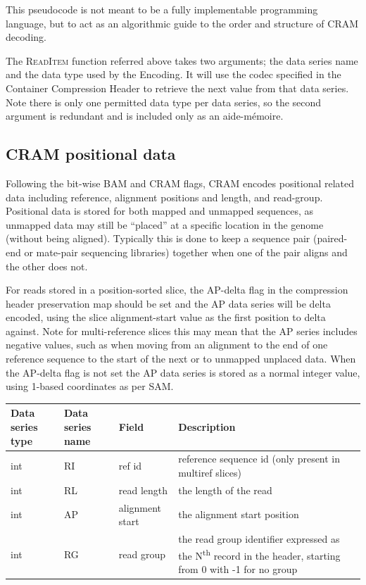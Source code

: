 \documentclass[a4paper]{article}
\begin{document}
This pseudocode is not meant to be a fully implementable programming
language, but to act as an algorithmic guide to the order and
structure of CRAM decoding.

The \textsc{ReadItem} function referred above takes two arguments; the
data series name and the data type used by the Encoding.  It will use
the codec specified in the Container Compression Header to retrieve
the next value from that data series.  Note there is only one
permitted data type per data series, so the second argument is
redundant and is included only as an aide-m\'emoire.

\subsection{\textbf{CRAM positional data}}
\label{subsec:positions}

Following the bit-wise BAM and CRAM flags, CRAM encodes positional related data including reference, alignment positions and length, and read-group.
Positional data is stored for both mapped and unmapped sequences, as unmapped data may still be ``placed'' at a specific location in the genome (without being aligned).
Typically this is done to keep a sequence pair (paired-end or mate-pair sequencing libraries) together when one of the pair aligns and the other does not.

For reads stored in a position-sorted slice, the AP-delta flag in the compression header preservation map should be set and the AP data series will be delta encoded, using the slice alignment-start value as the first position to delta against.
Note for multi-reference slices this may mean that the AP series includes negative values, such as when moving from an alignment to the end of one reference sequence to the start of the next or to unmapped unplaced data.
When the AP-delta flag is not set the AP data series is stored as a normal integer value, using 1-based coordinates as per SAM.

\begin{tabular}{|>{\raggedright}p{70pt}|>{\raggedright}p{75pt}|>{\raggedright}p{90pt}|>{\raggedright}p{171pt}|}
\hline
\textbf{Data series type} & \textbf{Data series name} & \textbf{Field} & \textbf{Description}\tabularnewline
\hline
int & RI & ref id & reference sequence id (only present in multiref slices)\tabularnewline
\hline
int & RL & read length & the length of the read\tabularnewline
\hline
int & AP & alignment start & the alignment start position\tabularnewline
\hline
int & RG & read group & the read group identifier expressed as the N\textsuperscript{th} record in the header, starting from 0 with -1 for no group\tabularnewline
\hline
\end{tabular}
\end{document}
